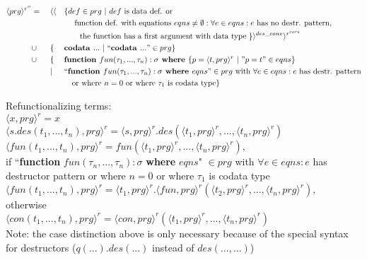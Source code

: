 \documentclass[11pt]{article} %
\begin{document}
\begin{alignat*}{3}
\langle prg \rangle^{r''} & = ~&& \langle \langle && \{ def \in prg ~ | ~ def \textrm{ is data def. or} \\ & && &&\quad \textrm{ function def. with equations } eqns \neq \emptyset: \forall e \in eqns: e \textrm{ has no destr. pattern}, \\
& && &&\qquad \textrm{the function has a first argument with data type } \} \rangle^{des\_conv} \rangle^{r^{core}} \\
& \cup && \{ && \textrm{\textbf{codata }} ... ~ | ~ `` \textrm{\textbf{codata }} ... " \in prg \} \\
& \cup && \{ && \textrm{\textbf{function }} fun(\tau_1, ..., \tau_n): \sigma \textrm{\textbf{ where }} \{ p = \langle t, prg \rangle^r ~ | ~ "p = t" \in eqns \} \\
& && | && `` \textrm{\textbf{function }} fun(\tau_1, ..., \tau_n): \sigma \textrm{\textbf{ where }} eqns " \in prg \textrm{ with } \forall e \in eqns: e \textrm{ has destr. pattern} \\
& && &&\quad \textrm{or where } n = 0 \textrm{ or where } \tau_1 \textrm{ is codata type} \} 
\end{alignat*}

Refunctionalizing terms: \\
$\langle x, prg \rangle^r = x$ \\
$\langle s.des(t_1, ..., t_n), prg \rangle^r = \langle s, prg \rangle^r .des(\langle t_1, prg \rangle^r, ..., \langle t_n, prg \rangle^r)$ \\
$\langle fun(t_1, ..., t_n), prg \rangle^r = fun(\langle t_1, prg \rangle^r, ..., \langle t_n, prg \rangle^r)$, \\
if ``\textbf{function} $fun(\tau_n, ..., \tau_n): \sigma$ \textbf{where} $eqns$" $\in prg$  with $\forall e \in eqns: e$ has destructor pattern or where $n = 0$ or where $\tau_1$ is codata type  \\
$\langle fun(t_1, ..., t_n), prg \rangle^r = \langle t_1, prg \rangle^r .\langle fun, prg \rangle^r (\langle t_2, prg \rangle^r, ..., \langle t_n, prg \rangle^r)$, \\
otherwise \\
$\langle con(t_1, ..., t_n), prg \rangle^r = \langle con, prg \rangle^r (\langle t_1, prg \rangle^r, ..., \langle t_n, prg \rangle^r)$ \\

Note: the case distinction above is only necessary because of the special syntax for destructors ($q(...).des(...)$ instead of $des(..., ...)$)
\end{document}
